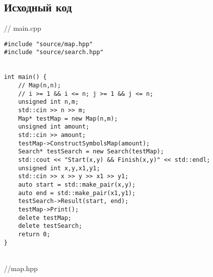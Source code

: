 \documentclass[12pt]{article}
\begin{document}
\subsection*{Исходный код}

// main.cpp
\begin{verbatim}
#include "source/map.hpp"
#include "source/search.hpp"


int main() {
    // Map(n,n);
    // i >= 1 && i <= n; j >= 1 && j <= n;
    unsigned int n,m;
    std::cin >> n >> m;
    Map* testMap = new Map(n,m);
    unsigned int amount;
    std::cin >> amount;
    testMap->ConstructSymbolsMap(amount);
    Search* testSearch = new Search(testMap);
    std::cout << "Start(x,y) && Finish(x,y)" << std::endl;
    unsigned int x,y,x1,y1;
    std::cin >> x >> y >> x1 >> y1;
    auto start = std::make_pair(x,y);
    auto end = std::make_pair(x1,y1);
    testSearch->Result(start, end);
    testMap->Print();
    delete testMap;
    delete testSearch;
    return 0;
}
\end{verbatim}
\\
//map.hpp
\end{document}
